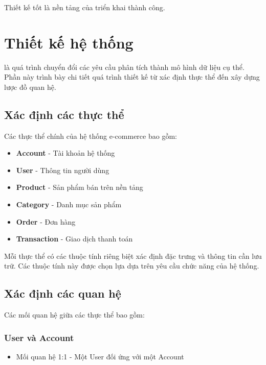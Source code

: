 \begin{savequote}[75mm]
Thiết kế tốt là nền tảng của triển khai thành công.
\end{savequote}

\chapter{Thiết kế hệ thống}

 là quá trình chuyển đổi các yêu cầu phân tích thành mô hình dữ liệu cụ thể. Phần này trình bày chi tiết quá trình thiết kế từ xác định thực thể đến xây dựng lược đồ quan hệ.

\section{Xác định các thực thể}

Các thực thể chính của hệ thống e-commerce bao gồm:

\begin{itemize}
    \item \textbf{Account} - Tài khoản hệ thống
    \item \textbf{User} - Thông tin người dùng
    \item \textbf{Product} - Sản phẩm bán trên nền tảng
    \item \textbf{Category} - Danh mục sản phẩm
    \item \textbf{Order} - Đơn hàng
    \item \textbf{Transaction} - Giao dịch thanh toán
\end{itemize}

Mỗi thực thể có các thuộc tính riêng biệt xác định đặc trưng và thông tin cần lưu trữ. Các thuộc tính này được chọn lựa dựa trên yêu cầu chức năng của hệ thống.

\section{Xác định các quan hệ}

Các mối quan hệ giữa các thực thể bao gồm:

\subsection{User và Account}
\begin{itemize}
    \item Mối quan hệ 1:1 - Một User đối ứng với một Account
\end{itemize}

